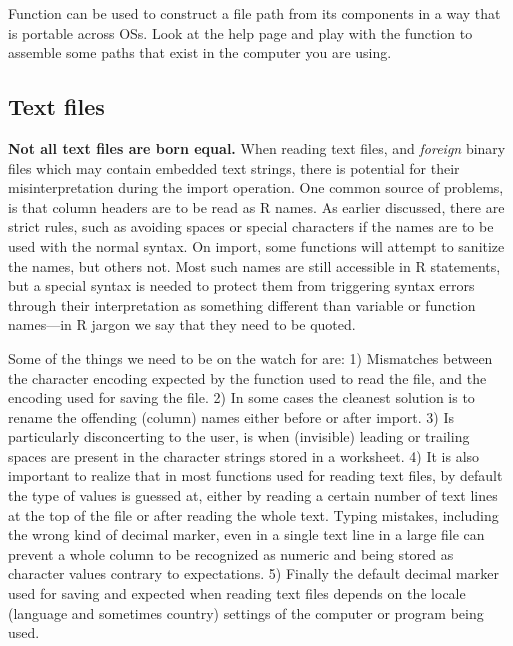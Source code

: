 \documentclass[krantz2]{krantz}\usepackage{knitr}%
\begin{document}
\begin{playground}
Function  can be used to construct a file path from its components in a way that is portable across OSs. Look at the help page and play with the function to assemble some paths that exist in the computer you are using.
\end{playground}

\subsection{Text files}\label{sec:files:txt}

\begin{warningbox}
\textbf{Not all text files are born equal.} When reading text files, and \emph{foreign} binary files which may contain embedded text strings, there is potential for their misinterpretation during the import operation. One common source of problems, is that column headers are to be read as R names. As earlier discussed, there are strict rules, such as avoiding spaces or special characters if the names are to be used with the normal syntax. On import, some functions will attempt to sanitize the names, but others not. Most such names are still accessible in R statements, but a special syntax is needed to protect them from triggering syntax errors through their interpretation as something different than variable or function names---in R jargon we say that they need to be quoted.

Some of the things we need to be on the watch for are:
1) Mismatches between the character encoding expected by the function used to read the file, and the encoding used for saving the file.
2) In some cases the cleanest solution is to rename the offending (column) names either before or after import.
3) Is particularly disconcerting to the user, is when (invisible) leading or trailing spaces are present in the character strings stored in a worksheet.
4) It is also important to realize that in most functions used for reading text files, by default the type of values is guessed at, either by reading a certain number of text lines at the top of the file or after reading the whole text. Typing mistakes, including the wrong kind of decimal marker, even in a single text line in a large file can prevent a whole column to be recognized as numeric and being stored as character values contrary to expectations.
5) Finally the default decimal marker used for saving and expected when reading text files depends on the locale (language and sometimes country) settings of the computer or program being used.


\end{warningbox}
\end{document}
